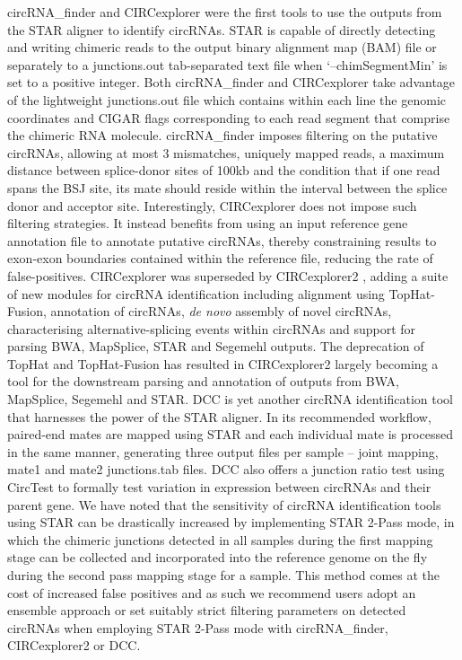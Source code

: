 \documentclass[journal,review,submit,pdftex,moreauthors]{Definitions/mdpi}
\begin{document}
circRNA\_finder \cite{circRNA_finder} and CIRCexplorer \cite{CIRCexplorer} were the first tools to use the outputs from the STAR aligner to identify circRNAs. STAR is capable of directly detecting and writing chimeric reads to the output binary alignment map (BAM) file or separately to a junctions.out tab-separated text file when `--chimSegmentMin' is set to a positive integer. Both circRNA\_finder and CIRCexplorer take advantage of the lightweight junctions.out file which contains within each line the genomic coordinates and CIGAR flags corresponding to each read segment that comprise the chimeric RNA molecule. circRNA\_finder imposes filtering on the putative circRNAs, allowing at most 3 mismatches, uniquely mapped reads, a maximum distance between splice-donor sites of 100kb and the condition that if one read spans the BSJ site, its mate should reside within the interval between the splice donor and acceptor site. Interestingly, CIRCexplorer does not impose such filtering strategies. It instead benefits from using an input reference gene annotation file to annotate putative circRNAs, thereby constraining results to exon-exon boundaries contained within the reference file, reducing the rate of false-positives. CIRCexplorer was superseded by CIRCexplorer2 \cite{CIRCexplorer2}, adding a suite of new modules for circRNA identification including alignment using TopHat-Fusion, annotation of circRNAs, \textit{de novo} assembly of novel circRNAs, characterising alternative-splicing events within circRNAs and support for parsing BWA, MapSplice, STAR and Segemehl outputs. The deprecation of TopHat and TopHat-Fusion has resulted in CIRCexplorer2 largely becoming a tool for the downstream parsing and annotation of outputs from BWA, MapSplice, Segemehl and STAR. DCC \cite{DCC} is yet another circRNA identification tool that harnesses the power of the STAR aligner. In its recommended workflow, paired-end mates are mapped using STAR and each individual mate is processed in the same manner, generating three output files per sample -- joint mapping, mate1 and mate2 junctions.tab files. DCC also offers a junction ratio test using CircTest to formally test variation in expression between circRNAs and their parent gene. We have noted that the sensitivity of circRNA identification tools using STAR can be drastically increased by implementing STAR 2-Pass mode, in which the chimeric junctions detected in all samples during the first mapping stage can be collected and incorporated into the reference genome on the fly during the second pass mapping stage for a sample. This method comes at the cost of increased false positives \cite{Engstrom2013Dec} and as such we recommend users adopt an ensemble approach or set suitably strict filtering parameters on detected circRNAs when employing STAR 2-Pass mode with circRNA\_finder, CIRCexplorer2 or DCC. \par
\end{document}
